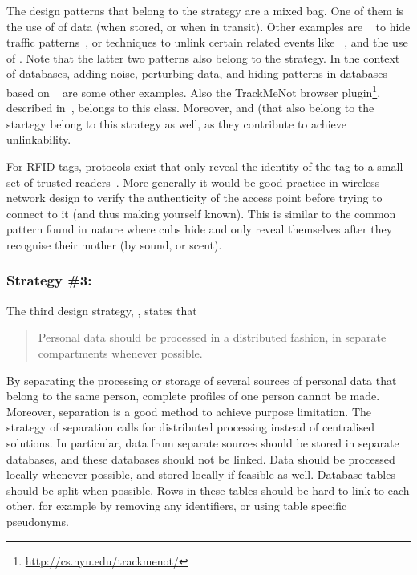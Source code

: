 The design patterns that belong to the  strategy are a mixed bag. One of them is the use of  of data (when stored, or when in transit). Other examples are ~\cite{DBLP:journals/cacm/Chaum81} to hide traffic patterns~\cite{DBLP:journals/cacm/Chaum81}, or techniques to unlink certain related events like ~\cite{DBLP:conf/eurocrypt/CamenischL01},  and the use of . Note that the latter two patterns also belong to the  strategy. In the context of databases, adding noise, perturbing data, and hiding patterns in databases~\cite{ilprints1014}
based on ~\cite{DBLP:conf/icalp/Dwork06} are some other examples. Also the TrackMeNot browser plugin\footnote{\url{http://cs.nyu.edu/trackmenot/}
}, described in~\cite{howe2008trackmenot}, belongs to this class.
Moreover,  and  (that also belong to the  startegy belong to this strategy as well, as they contribute to achieve unlinkability.

For RFID tags, protocols exist that only reveal the identity of the tag to a small set of trusted readers~\cite{juels2006rfid-secpriv-survey}. More generally it would be good practice in wireless network design to verify the authenticity of the access point before trying to connect to it (and thus making yourself known). This is similar to the common pattern found in nature where cubs hide and only reveal themselves after they recognise their mother (by sound, or scent). 

\subsubsection{Strategy \#3: }

The third design strategy, , states that 
\begin{quote}
Personal data should be processed in a distributed fashion, in separate compartments whenever possible.
\end{quote}
By separating the processing or storage of several sources of personal data that belong to the same person, complete profiles of one person cannot be made. Moreover, separation is a good method to achieve purpose limitation. The strategy of separation calls for distributed processing instead of centralised solutions. In particular, data from separate sources should be stored in separate databases, and these databases should not be linked. Data should be processed locally whenever possible, and stored locally if feasible as well. Database tables should be split when possible. Rows in these tables should be hard to link to each other, for example by removing any identifiers, or using table specific pseudonyms.

